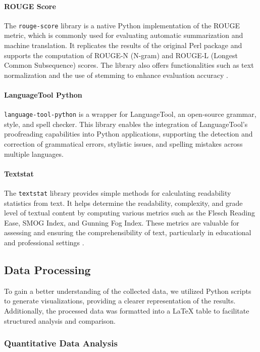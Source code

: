 \paragraph{ROUGE Score}
The \texttt{rouge-score} library is a native Python implementation of the ROUGE metric, which is commonly used for evaluating automatic summarization and machine translation. It replicates the results of the original Perl package and supports the computation of ROUGE-N (N-gram) and ROUGE-L (Longest Common Subsequence) scores. The library also offers functionalities such as text normalization and the use of stemming to enhance evaluation accuracy \cite{rouge-score}.

\paragraph{LanguageTool Python}
\texttt{language-tool-python} is a wrapper for LanguageTool, an open-source grammar, style, and spell checker. This library enables the integration of LanguageTool's proofreading capabilities into Python applications, supporting the detection and correction of grammatical errors, stylistic issues, and spelling mistakes across multiple languages.

\paragraph{Textstat}
The \texttt{textstat} library provides simple methods for calculating readability statistics from text. It helps determine the readability, complexity, and grade level of textual content by computing various metrics such as the Flesch Reading Ease, SMOG Index, and Gunning Fog Index. These metrics are valuable for assessing and ensuring the comprehensibility of text, particularly in educational and professional settings \cite{textstat}.


\subsection{Data Processing}

To gain a better understanding of the collected data, we utilized Python scripts to generate visualizations, 
providing a clearer representation of the results. Additionally, the processed data was formatted into a LaTeX table to facilitate structured analysis and comparison.

\subsubsection{Quantitative Data Analysis}

